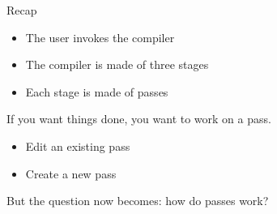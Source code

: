 \begin{frame}{Recap}
\begin{itemize}
\item The \alert{user} invokes the \alert{compiler}
\item The \alert{compiler} is made of three \alert{stages}
\item Each \alert{stage} is made of \alert{passes}
\end{itemize}
\medskip
If you want things done, you want to work on a \alert{pass}.\\
\medskip
\begin{itemize}
\item Edit an existing pass
\item Create a new pass
\end{itemize}
\medskip
But the question now becomes: how do passes work?
\end{frame}







